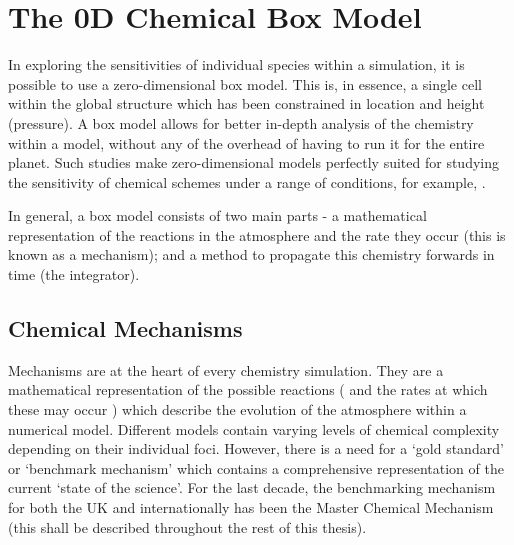 \section{The 0D Chemical Box Model}
In exploring the sensitivities of individual species within a simulation, it is possible to use a zero-dimensional box model. This is, in essence, a single cell within the global structure which has been constrained in location and height (pressure). A box model allows for better in-depth analysis of the chemistry within a model, without any of the overhead of having to run it for the entire planet. Such studies make zero-dimensional models perfectly suited for studying the sensitivity of chemical schemes under a range of conditions, for example, \citep{dsmacc}.

In general, a box model consists of two main parts - a mathematical representation of the reactions in the atmosphere and the rate they occur (this is known as a mechanism); and a method to propagate this chemistry forwards in time (the integrator).



\subsection{Chemical Mechanisms}
Mechanisms are at the heart of every chemistry simulation. They are a mathematical representation of the possible reactions ( and the rates at which these may occur ) which describe the evolution of the atmosphere within a numerical model. Different models contain varying levels of chemical complexity depending on their individual foci. However, there is a need for a `gold standard' or `benchmark mechanism' which contains a comprehensive representation of the current `state of the science'. For the last decade, the benchmarking mechanism for both the UK and internationally has been the Master Chemical Mechanism \citep{mcm} (this shall be described throughout the rest of this thesis).


